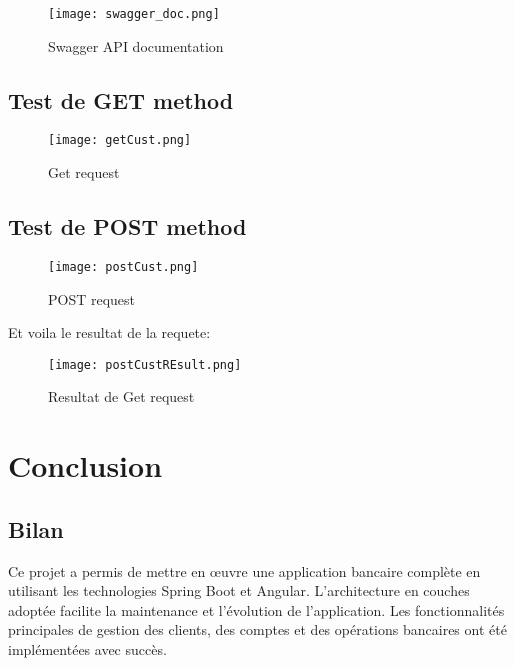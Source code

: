 \documentclass[12pt,a4paper]{report}
\begin{document}
\begin{figure}[H]
    \centering
    \texttt{[image: swagger\_doc.png]}
    \caption{Swagger API documentation}
    \label{fig:Swagger_API_documentation}
\end{figure}

\section{Test de GET method}
\begin{figure}[H]
    \centering
    \texttt{[image: getCust.png]}
    \caption{Get request}
    \label{fig:Get_request}
\end{figure}


\section{Test de POST method}

\begin{figure}[H]
    \centering
    \texttt{[image: postCust.png]}
    \caption{POST request}
    \label{fig:Get_request}
\end{figure}

Et voila le resultat de la requete:

\begin{figure}[H]
    \centering
    \texttt{[image: postCustREsult.png]}
    \caption{Resultat de Get request}
    \label{fig:Resultat_de_Get_request}
\end{figure}



\chapter*{Conclusion}
\section{Bilan}
Ce projet a permis de mettre en œuvre une application bancaire complète en utilisant les technologies Spring Boot et Angular. L'architecture en couches adoptée facilite la maintenance et l'évolution de l'application. Les fonctionnalités principales de gestion des clients, des comptes et des opérations bancaires ont été implémentées avec succès.
\end{document}
